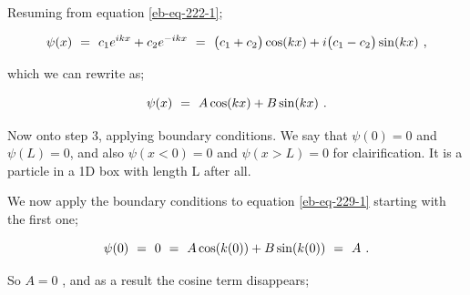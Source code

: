 \documentclass{article}
\begin{document}
Resuming from equation \ref{eb-eq-222-1};

\begin{equation} \label{eb-eq-229-1}
\psi(x) \hspace{0.125cm} = \hspace{0.125cm} c_1 e^{ikx} + c_2 e^{-ikx} \hspace{0.125cm} = \hspace{0.125cm} \big(c_1 + c_2\big)\cos(kx) + i\big(c_1 - c_2\big)\sin(kx) \hspace{0.125cm} , 
\end{equation}

which we can rewrite as;

\begin{equation} \label{eb-eq-230-1}
\psi(x) \hspace{0.125cm} = \hspace{0.125cm} A\cos(kx) + B\sin(kx) \hspace{0.125cm} .
\end{equation}

Now onto step 3, applying boundary conditions. We say that \begin{math} \psi(0) = 0 \end{math} and \begin{math} \psi(L) = 0 \end{math}, and also \begin{math} \psi(x < 0) = 0 \end{math} and \begin{math} \psi(x > L) = 0 \end{math} for clairification. It is a particle in a 1D box with length L after all.

We now apply the boundary conditions to equation \ref{eb-eq-229-1} starting with the first one;

\begin{equation} \label{eb-eq-231-1}
\psi(0) \hspace{0.125cm} = \hspace{0.125cm} 0 \hspace{0.125cm} = \hspace{0.125cm} A\cos(k(0)) + B\sin(k(0))  \hspace{0.125cm} = \hspace{0.125cm} A \hspace{0.125cm} . 
\end{equation}

So \begin{math} A = 0 \end{math} , and as a result the cosine term disappears;
\end{document}
